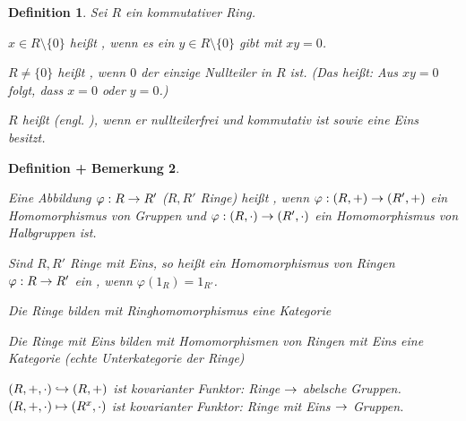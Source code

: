 \documentclass[a4paper,10pt,german]{scrbook}
\theoremstyle{saetze}
\theoremstyle{definitionen}
\newtheorem{Def}{Definition}[section]
\newtheorem{DefBem}[Def]{Definition + Bemerkung}
\begin{document}
\begin{Def}
Sei $R$ ein kommutativer Ring.
\begin{enum}
\item $x\in R\setminus\{0\}$ heißt , wenn es ein
$y \in R \setminus \{0\}$ gibt mit $xy = 0$.
\item $R\ne \{0\}$ heißt , wenn $0$ der einzige
Nullteiler in $R$ ist. (Das heißt: Aus $xy = 0$ folgt, dass $x=0$ oder
$y=0$.)
\item $R$ heißt  (engl. ), wenn er
nullteilerfrei und kommutativ ist sowie eine Eins besitzt.
\end{enum}

\end{Def}
  
\begin{DefBem}
\begin{enum}
\item Eine Abbildung $\varphi: R \rightarrow R'$ ($R,R'$ Ringe) heißt
, wenn $\varphi: (R,+) \rightarrow (R',+)$ ein
Homomorphismus von Gruppen und $\varphi: (R,\cdot) \rightarrow (R',\cdot)$ ein 
Homomorphismus von Halbgruppen ist.
\item Sind $R,R'$ Ringe mit Eins, so heißt ein Homomorphismus von Ringen
$\varphi: R \rightarrow R'$ ein , wenn
$\varphi(1_R) = 1_{R'}$.
\item Die Ringe bilden mit Ringhomomorphismus eine Kategorie
\item Die Ringe mit Eins bilden mit Homomorphismen von Ringen mit
Eins eine Kategorie (echte Unterkategorie der Ringe)
\item ${(R,+,\cdot)}
\hookrightarrow {(R,+)}$ ist
kovarianter Funktor: Ringe $\rightarrow$ abelsche Gruppen.
\medskip\newline$(R,+, \cdot) \mapsto (R^x, \cdot)$ ist kovarianter
Funktor: Ringe mit Eins $\rightarrow$ Gruppen.
\end{enum}
\end{DefBem}
\end{document}
